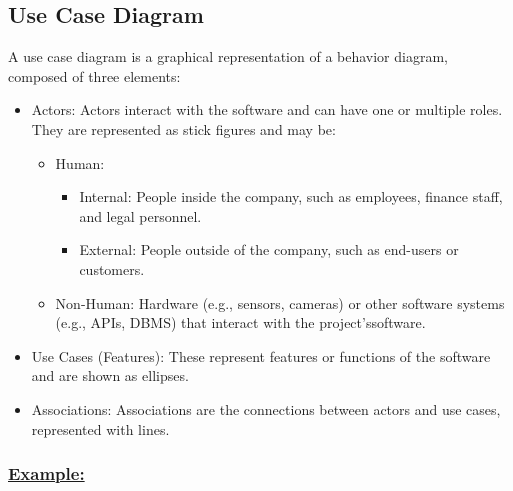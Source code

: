 \subsection{Use Case Diagram}
A use case diagram is a graphical representation of a behavior diagram, composed of three elements:

\begin{itemize} 
    \item Actors: Actors interact with the software and can have one or multiple roles. They are represented as
stick figures and may be: 
        \begin{itemize} 
            \item Human: 
              \begin{itemize} 
                \item Internal: People inside the company, such as employees, finance staff, and legal personnel.
                \item External: People outside of the company, such as end-users or customers. 
              \end{itemize} 
            \item Non-Human: Hardware (e.g., sensors, cameras) or other software systems (e.g., APIs, DBMS) that 
interact with the project’ssoftware. 
      \end{itemize} 
   \item Use Cases (Features): These represent features or functions of the software and are shown as ellipses.
   \item Associations: Associations are the connections between actors and use cases, represented with lines. 
\end{itemize}

\vspace{0.5cm}
\subsubsection*{\underline{Example:}}

